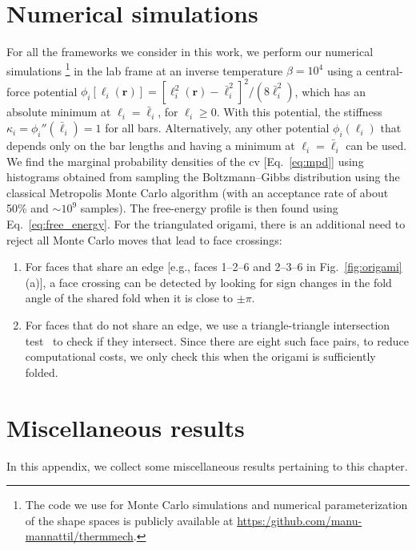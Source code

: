 \begin{subappendices}

\section{Numerical simulations}
\label{sec:numerics}

For all the frameworks we consider in this work, we perform our numerical simulations%
\footnote{The code we use for Monte Carlo simulations and numerical parameterization of the shape spaces is publicly available at \url{https:/github.com/manu-mannattil/thermmech}.}
in the lab frame at an inverse temperature $\beta = 10^{4}$ using a central-force potential $\phi_i[\ell_i(\bm{r})] = [\ell_i^{2}(\bm{r}) - \bar{\ell}_i^2]^2/(8\bar{\ell}_i^2)$, which has an absolute minimum at $\ell_i = \bar{\ell}_i$, for $\ell_i \geq 0$.
With this potential, the stiffness $\kappa_{i} = \phi_i''(\bar{\ell}_i) = 1$ for all bars.
Alternatively, any other potential $\phi_{i}(\ell_{i})$ that depends only on the bar lengths and having a minimum at $\ell_{i} = \bar{\ell}_{i}$ can be used.
We find the marginal probability densities of the \ac{cv} [Eq.~\eqref{eq:mpd}] using histograms obtained from sampling the Boltzmann--Gibbs distribution using the classical Metropolis Monte Carlo algorithm (with an acceptance rate of about 50\% and $\sim 10^{9}$ samples).
The free-energy profile is then found using Eq.~\eqref{eq:free_energy}.
For the triangulated origami, there is an additional need to reject all Monte Carlo moves that lead to face crossings:
%
\begin{enumerate}
  \item For faces that share an edge [e.g., faces 1--2--6 and 2--3--6 in Fig.~\ref{fig:origami}(a)], a face crossing can be detected by looking for sign changes in the fold angle of the shared fold when it is close to $\pm \pi$.
  \item For faces that do not share an edge, we use a triangle-triangle intersection test~\cite{tropp2006} to check if they intersect.
    Since there are eight such face pairs, to reduce computational costs, we only check this when the origami is sufficiently folded.
\end{enumerate}

\section{Miscellaneous results}

In this appendix, we collect some miscellaneous results pertaining to this chapter.


\end{subappendices}
